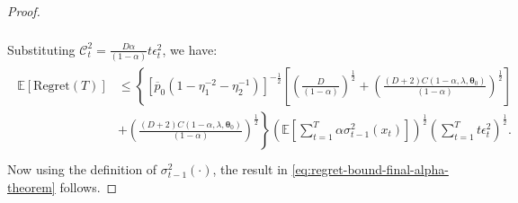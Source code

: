 \documentclass[final,12pt]{colt2026} %
\begin{document}
\begin{proof}
\begin{align}
\begin{split}
\end{split} 
\end{align}
Substituting $\mathcal{C}_t^2=\frac{D\alpha}{(1-\alpha)} t\epsilon_t^2$, we have:
\begin{align}\label{eq:regret-bound-final}
\begin{split}
    \mathbb{E}[\mathrm{Regret}(T)] &\leq \left\{[\overline{p}_0(1-\eta_1^{-2}-\eta_2^{-1})]^{-\frac{1}{2}}\left[\left(\frac{D}{(1-\alpha)}\right)^{\frac{1}{2}} + \left(\frac{(D+2) C(1-\alpha, \lambda, \pmb{\theta}_0)}{(1-\alpha)}\right)^{\frac{1}{2}}\right]\right.\\
    &\left.+ \left(\frac{(D+2) C(1-\alpha, \lambda, \pmb{\theta}_0)}{(1-\alpha)}\right)^{\frac{1}{2}}\right\} \left( \mathbb{E} \left[ \sum_{t=1}^T \alpha \sigma_{t-1}^2(x_t)\right]  \right)^{\frac{1}{2}} \left(\sum_{t=1}^T  t\epsilon_t^2 \right)^{\frac{1}{2}}.\\
\end{split}
\end{align}
Now using the definition of $\sigma^2_{t-1}(\cdot)$, the result in \eqref{eq:regret-bound-final-alpha-theorem} follows.
\end{proof}
\end{document}
